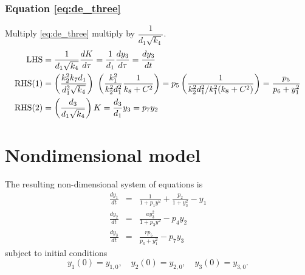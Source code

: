 \documentclass[10pt,letterpaper]{article}
\begin{document}
\subsubsection{Equation \eqref{eq:de_three}}
Multiply \eqref{eq:de_three} multiply by $\dfrac{1}{d_1 \sqrt{k_4}}$.
\begin{equation*} 
\begin{gathered}\begin{aligned}
{\rm LHS} &= \frac{1}{d_1 \sqrt{k_4}} \frac{dK}{d\tau}
           = \frac{1}{d_1} \frac{dy_3}{d\tau}
           = \frac{dy_3}{dt} \\
{\rm RHS(1)} &= \left( \frac{k_2^2 k_7 d_1}{d_1^2 \sqrt{k_4}} \right) \
              \left(  \frac{k_1^2}{k_2^2 d_1^2} \frac{1}{k_8 + C^2} \right)
              = p_5 \left( \frac{1}{ k_2^2 d_1^2 / k_1^2 (k_8+C^2)}\right)
              = \frac{p_5}{ p_6 + y_1^2}  \\
{\rm RHS(2)} &= \left( \frac{d_3}{d_1 \sqrt{k_4}} \right) K = \frac{d_3}{d_1} y_3 = p_7 y_2
\end{aligned}\end{gathered}
\end{equation*}


\section{Nondimensional model}
The resulting non-dimensional system of equations is
\begin{eqnarray}
\frac{dy_1}{dt} &=& \frac{1}{1 + p_1 y^2} + \frac{p_2}{1 + y_3^2} - y_1  \label{nondim_de_one} \\
\frac{dy_2}{dt} &=& \frac{a y_3^2}{1 + p_3 y^2} - p_4 y_2 \label{nondim_de_two} \\
\frac{dy_3}{dt} &=& \frac{r p_5}{p_6 + y_1^2} - p_7 y_3 \label{nondim_de_three}
\end{eqnarray}
subject to initial conditions
\begin{equation}
y_1(0) = y_{1,0}, \quad y_2(0) = y_{2,0}, \quad y_3(0) = y_{3,0}.
\end{equation}



\end{document}
